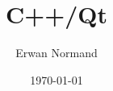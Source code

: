 \documentclass[a4paper,12pt]{report}
\title{C++/Qt}
\author{Erwan Normand}
\date{\today}
\begin{document}
\pagedetitre

\tableofcontents %







\appendix


\listoffigures
\end{document}
